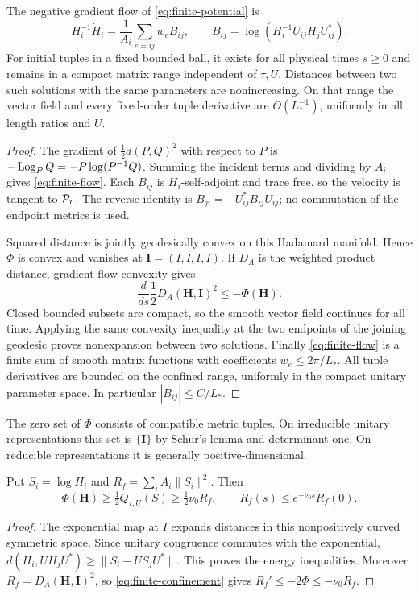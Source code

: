 \begin{proposition}\label{prop:finite-flow}
The negative gradient flow of \eqref{eq:finite-potential} is
\begin{equation}\label{eq:finite-flow}
 H_i^{-1}\dot H_i=\frac1{A_i}\sum_{e=ij}w_e B_{ij},
 \qquad B_{ij}=\log(H_i^{-1}U_{ij}H_jU_{ij}^*).
\end{equation}
For initial tuples in a fixed bounded ball, it exists for all
physical times $s\ge0$ and remains in a compact matrix range
independent of $\tau,U$. Distances between two such solutions
with the same parameters are nonincreasing. On that range the
vector field and every fixed-order tuple derivative are
$O(L_*^{-1})$, uniformly in all length ratios and $U$.
\end{proposition}
\begin{proof}
The gradient of $\frac12d(P,Q)^2$ with respect to $P$
is $-\operatorname{Log}_PQ=-P\log(P^{-1}Q)$. Summing the incident
terms and dividing by $A_i$ gives \eqref{eq:finite-flow}.
Each $B_{ij}$ is $H_i$-self-adjoint and trace free,
so the velocity is tangent to $\mathcal P_r$. The reverse
identity is $B_{ji}=-U_{ij}^*B_{ij}U_{ij}$; no
commutation of the endpoint metrics is used.

Squared distance is jointly geodesically convex on
this Hadamard manifold. Hence $\Phi$ is convex and
vanishes at $\mathbf I=(I,I,I,I)$. If $D_A$ is the
weighted product distance, gradient-flow convexity gives
\begin{equation}\label{eq:finite-confinement}
 \frac d{ds}\frac12D_A(\mathbf H,\mathbf I)^2
 \le-\Phi(\mathbf H).
\end{equation}
Closed bounded subsets are compact, so the smooth
vector field continues for all time. Applying the
same convexity inequality at the two endpoints of
the joining geodesic proves nonexpansion between
two solutions. Finally \eqref{eq:finite-flow} is a
finite sum of smooth matrix functions with coefficients
$w_e\le2\pi/L_*$. All tuple derivatives are bounded
on the confined range, uniformly in the compact
unitary parameter space. In particular
$|\dot B_{ij}|\le C/L_*$.
\end{proof}

The zero set of $\Phi$ consists of compatible metric
tuples. On irreducible unitary representations this set
is $\{\mathbf I\}$ by Schur's lemma and determinant
one. On reducible representations it is generally
positive-dimensional.

\begin{lemma}\label{lem:finite-coercivity}
Put $S_i=\log H_i$ and $R_f=\sum_iA_i\|S_i\|^2$.
Then
\[
 \Phi(\mathbf H)\ge\tfrac12Q_{\tau,U}(S)
 \ge\tfrac12\nu_0R_f,\qquad
 R_f(s)\le e^{-\nu_0s}R_f(0).
\]
\end{lemma}
\begin{proof}
The exponential map at $I$ expands distances in this
nonpositively curved symmetric space. Since unitary
congruence commutes with the exponential,
$d(H_i,UH_jU^*)\ge\|S_i-US_jU^*\|$.
This proves the energy inequalities. Moreover
$R_f=D_A(\mathbf H,\mathbf I)^2$, so
\eqref{eq:finite-confinement} gives
$R_f'\le-2\Phi\le-\nu_0R_f$.
\end{proof}

